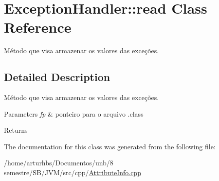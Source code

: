 \hypertarget{classExceptionHandler_1_1read}{}\section{Exception\+Handler\+:\+:read Class Reference}
\label{classExceptionHandler_1_1read}


Método que visa armazenar os valores das exceções.  




\subsection{Detailed Description}
Método que visa armazenar os valores das exceções. 


\begin{DoxyParams}{Parameters}
{\em fp} & ponteiro para o arquivo .class \\
\hline
\end{DoxyParams}
\begin{DoxyReturn}{Returns}

\end{DoxyReturn}


The documentation for this class was generated from the following file\+:\begin{DoxyCompactItemize}
\item 
/home/arturhbs/\+Documentos/unb/8 semestre/\+S\+B/\+J\+V\+M/src/cpp/\hyperlink{AttributeInfo_8cpp}{Attribute\+Info.\+cpp}\end{DoxyCompactItemize}
